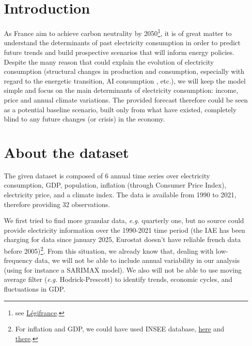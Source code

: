 


 

\newpage

\section{Introduction}
As France aim to achieve carbon neutrality by 2050\footnote{see \href{https://www.legifrance.gouv.fr/jorf/id/JORFTEXT000041814459}{Légifrance}.}, it is of great matter to understand the determinants of past electricity consumption in order to predict future trends and build prospective scenarios that will inform energy policies. Despite the many reason that could explain the evolution of electricity consumption (structural changes in production and consumption, especially with regard to the energetic transition, AI consumption \cite{de2023growing}, etc.), we will keep the model simple and focus on the main determinants of electricity consumption: income, price and annual climate variations. The provided forecast therefore could be seen as a potential baseline scenario, built only from what have existed, completely blind to any future changes (or crisis) in the economy.

\section{About the dataset}

The given dataset is composed of 6 annual time series over electricity consumption, GDP, population, inflation (through Consumer Price Index), electricity price, and a climate index. The data is available from 1990 to 2021, therefore providing 32 observations. 

We first tried to find more granular data, \textit{e.g.} quarterly one, but no source could provide electricity information over the 1990-2021 time period (the IAE has been charging for data since january 2025, Eurostat doesn't have reliable french data before 2005)\footnote{For inflation and GDP, we could have used INSEE database, \href{https://www.insee.fr/fr/statistiques/serie/001763852\#Telechargement}{here} and
\href{https://www.insee.fr/fr/statistiques/8196636?sommaire=8182908\#consulter}{there}.}. From this situation, we already know that, dealing with low-frequency data, we will not be able to include annual variability in our analysis (using for instance a SARIMAX model). We also will not be able to use moving average filter (\textit{e.g.} Hodrick-Prescott) to identify trends, economic cycles, and fluctuations in GDP.

